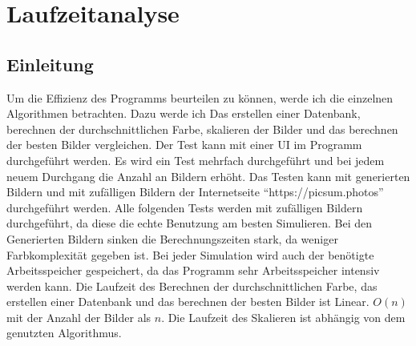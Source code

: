 \section{Laufzeitanalyse}
\subsection{Einleitung}
Um die Effizienz des Programms beurteilen zu können, werde ich die einzelnen Algorithmen betrachten. Dazu werde ich Das erstellen einer Datenbank, berechnen der durchschnittlichen Farbe, skalieren der Bilder und das berechnen der besten Bilder vergleichen. Der Test kann mit einer UI im Programm durchgeführt werden. Es wird ein Test mehrfach durchgeführt und bei jedem neuem Durchgang die Anzahl an Bildern erhöht. Das Testen kann mit generierten Bildern und mit zufälligen Bildern der Internetseite ``https://picsum.photos'' durchgeführt werden. Alle folgenden Tests werden mit zufälligen Bildern durchgeführt, da diese die echte Benutzung am besten Simulieren. Bei den Generierten Bildern sinken die Berechnungszeiten stark, da weniger Farbkomplexität gegeben ist. Bei jeder Simulation wird auch der benötigte Arbeitsspeicher gespeichert, da das Programm sehr Arbeitsspeicher intensiv werden kann. Die Laufzeit des Berechnen der durchschnittlichen Farbe, das erstellen einer Datenbank und das berechnen der besten Bilder ist Linear. $O(n)$ mit der Anzahl der Bilder als $n$. Die Laufzeit des Skalieren ist abhängig von dem genutzten Algorithmus.
